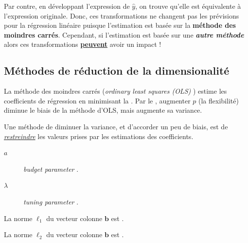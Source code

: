 \documentclass[french]{article}
\begin{document}
\begin{multicols*}{2}
\begin{rappel_enhanced}[Contexte]
\bigskip

Par contre, en développant l'expression de $\hat{y}$, on trouve qu'elle est équivalente à l'expression originale. Donc, ces transformations ne changent pas les prévisions pour la régression linéaire puisque l'estimation est basée sur la \textbf{méthode des moindres carrés}. Cependant, si l'estimation est basée sur une \textit{\textbf{autre méthode}} alors ces transformations \textbf{\underline{peuvent}} avoir un impact ! 
\end{rappel_enhanced}



\columnbreak
\subsection{Méthodes de réduction de la dimensionalité}
\begin{rappel_enhanced}[Contexte]
La méthode des moindres carrés (\og \textit{ordinary least squares (OLS)} \fg{}) estime les coefficients de régression en minimisant la . Par le \textit{\underline{}}, augmenter $p$ (la flexibilité) diminue le biais de la méthode d'OLS, mais augmente sa variance.

\bigskip

Une méthode de diminuer la variance, et d'accorder un peu de biais, est de \underline{\textit{restreindre}} les valeurs prises par les estimations des coefficients. 
\end{rappel_enhanced}

\begin{distributions}[Notation]
\begin{description}
	\item[$a$]	\og \textit{budget parameter} \fg{}.
	\item[$\lambda$]	\og \textit{tuning parameter} \fg{}.
\end{description}
\end{distributions}

\begin{definitionNOHFILL}
La norme $\ell_{1}$ du vecteur colonne $\bm{b}$ est .
\end{definitionNOHFILL}

\begin{definitionNOHFILL}
La norme $\ell_{2}$ du vecteur colonne $\bm{b}$ est .
\end{definitionNOHFILL}



\end{multicols*}
\end{document}
